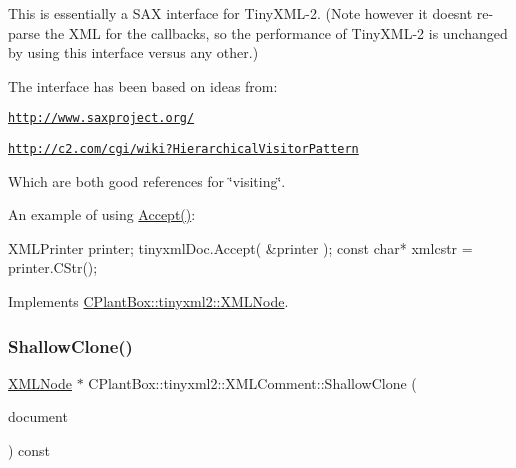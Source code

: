 This is essentially a S\+AX interface for Tiny\+X\+M\+L-\/2. (Note however it doesn\textquotesingle{}t re-\/parse the X\+ML for the callbacks, so the performance of Tiny\+X\+M\+L-\/2 is unchanged by using this interface versus any other.)

The interface has been based on ideas from\+:


\begin{DoxyItemize}
\item \href{http://www.saxproject.org/}{\tt http\+://www.\+saxproject.\+org/}
\item \href{http://c2.com/cgi/wiki?HierarchicalVisitorPattern}{\tt http\+://c2.\+com/cgi/wiki?\+Hierarchical\+Visitor\+Pattern}
\end{DoxyItemize}

Which are both good references for \char`\"{}visiting\char`\"{}.

An example of using \hyperlink{classCPlantBox_1_1tinyxml2_1_1XMLComment_a139f01ec7e0efdd01914e8d2cfd74791}{Accept()}\+: \begin{DoxyVerb}XMLPrinter printer;
tinyxmlDoc.Accept( &printer );
const char* xmlcstr = printer.CStr();
\end{DoxyVerb}
 

Implements \hyperlink{classCPlantBox_1_1tinyxml2_1_1XMLNode_a2cdc6f044bd1f971e211328e42a4f9d5}{C\+Plant\+Box\+::tinyxml2\+::\+X\+M\+L\+Node}.

\mbox{\label{classCPlantBox_1_1tinyxml2_1_1XMLComment_a08324700df05eaef00eec535ef5e02e3}} 
\subsubsection{\texorpdfstring{Shallow\+Clone()}{ShallowClone()}}
{\footnotesize\ttfamily \hyperlink{classCPlantBox_1_1tinyxml2_1_1XMLNode}{X\+M\+L\+Node} $\ast$ C\+Plant\+Box\+::tinyxml2\+::\+X\+M\+L\+Comment\+::\+Shallow\+Clone (\begin{DoxyParamCaption}\item[{\hyperlink{classCPlantBox_1_1tinyxml2_1_1XMLDocument}{X\+M\+L\+Document} $\ast$}]{document }\end{DoxyParamCaption}) const\hspace{0.3cm}{\ttfamily [virtual]}}

